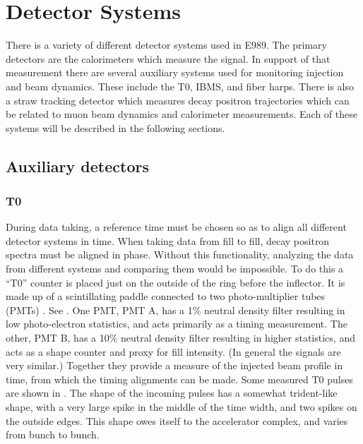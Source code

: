 
\thispagestyle{myheadings}

\graphicspath{{Body/Figures/ExperimentalOverview/Auxiliary/}{Body/Figures/ExperimentalOverview/Calorimeter/}{Body/Figures/ExperimentalOverview/Ring/}{Body/Figures/TrackingFigures/TrackerPics/}{Body/Figures/ExperimentalOverview/Ring/}{Body/Figures/TrackingFigures/CoordSys/}{Body/Figures/TrackingFigures/Drift/}{Body/Figures/TrackingFigures/Electronics/}}

\chapter{Detector Systems}
\label{sec:DetectorSystems}

There is a variety of different detector systems used in E989. The primary detectors are the calorimeters which measure the \wa signal. In support of that measurement there are several auxiliary systems used for monitoring injection and beam dynamics. These include the T0, IBMS, and fiber harps. There is also a straw tracking detector which measures decay positron trajectories which can be related to muon beam dynamics and calorimeter measurements. Each of these systems will be described in the following sections.



\section{Auxiliary detectors}

\subsection{T0}
\label{sec:T0}

During data taking, a reference time must be chosen so as to align all different detector systems in time. When taking data from fill to fill, decay positron spectra must be aligned in phase. Without this functionality, analyzing the data from different systems and comparing them would be impossible. To do this a ``T0'' counter is placed just on the outside of the ring before the inflector. It is made up of a scintillating paddle connected to two photo-multiplier tubes (PMTs) \cite{t0Hannah,t0Aaron}. See . One PMT, PMT A, has a 1\% neutral density filter resulting in low photo-electron statistics, and acts primarily as a timing measurement. The other, PMT B, has a 10\% neutral density filter resulting in higher statistics, and acts as a shape counter and proxy for fill intensity. (In general the signals are very similar.) Together they provide a measure of the injected beam profile in time, from which the timing alignments can be made. Some measured T0 pulses are shown in . The shape of the incoming pulses has a somewhat trident-like shape, with a very large spike in the middle of the time width, and two spikes on the outside edges. This shape owes itself to the accelerator complex, and varies from bunch to bunch.


